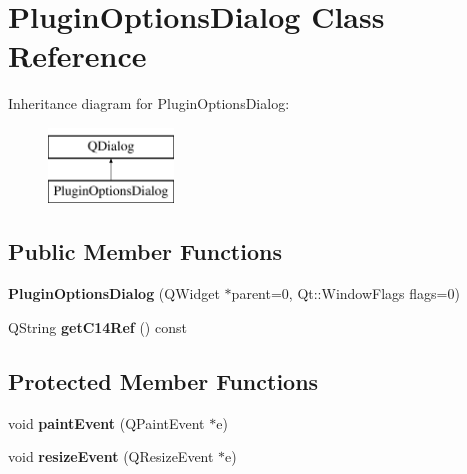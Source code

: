 \hypertarget{class_plugin_options_dialog}{\section{Plugin\-Options\-Dialog Class Reference}
\label{class_plugin_options_dialog}
}
Inheritance diagram for Plugin\-Options\-Dialog\-:\begin{figure}[H]
\begin{center}
\leavevmode
\includegraphics[height=2.000000cm]{class_plugin_options_dialog}
\end{center}
\end{figure}
\subsection*{Public Member Functions}
\begin{DoxyCompactItemize}
\item 
\hypertarget{class_plugin_options_dialog_ad6ae962a43f3d39a035832a0975bb22a}{{\bfseries Plugin\-Options\-Dialog} (Q\-Widget $\ast$parent=0, Qt\-::\-Window\-Flags flags=0)}\label{class_plugin_options_dialog_ad6ae962a43f3d39a035832a0975bb22a}

\item 
\hypertarget{class_plugin_options_dialog_a60a03d89d3d008ed32a5f4f9309dcb73}{Q\-String {\bfseries get\-C14\-Ref} () const }\label{class_plugin_options_dialog_a60a03d89d3d008ed32a5f4f9309dcb73}

\end{DoxyCompactItemize}
\subsection*{Protected Member Functions}
\begin{DoxyCompactItemize}
\item 
\hypertarget{class_plugin_options_dialog_a6f1562417f1159998d8a83e11c9b1761}{void {\bfseries paint\-Event} (Q\-Paint\-Event $\ast$e)}\label{class_plugin_options_dialog_a6f1562417f1159998d8a83e11c9b1761}

\item 
\hypertarget{class_plugin_options_dialog_a81ccb697ee6739e9ba1a1a955c8d4fc2}{void {\bfseries resize\-Event} (Q\-Resize\-Event $\ast$e)}\label{class_plugin_options_dialog_a81ccb697ee6739e9ba1a1a955c8d4fc2}

\end{DoxyCompactItemize}


